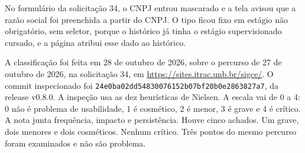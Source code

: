 No formulário da solicitação 34, o CNPJ entrou mascarado e a tela avisou que a razão social foi preenchida a partir do CNPJ. O tipo ficou fixo em estágio não obrigatório, sem seletor, porque o histórico já tinha o estágio supervisionado cursado, e a página atribui esse dado ao histórico.

A classificação foi feita em 28 de outubro de 2026, sobre o percurso de 27 de outubro de 2026, na solicitação 34, em \url{https://sites.itrac.unb.br/sigce/}. O commit inspecionado foi \texttt{24e0ba02\allowbreak dd548300\allowbreak 76152b07\allowbreak bf20b0e2\allowbreak 863827a7}, da release v0.8.0. A inspeção usa as dez heurísticas de Nielsen. A escala vai de 0 a 4: 0 não é problema de usabilidade, 1 é cosmético, 2 é menor, 3 é grave e 4 é crítico. A nota junta frequência, impacto e persistência. Houve cinco achados. Um grave, dois menores e dois cosméticos. Nenhum crítico. Três pontos do mesmo percurso foram examinados e não são problema.

